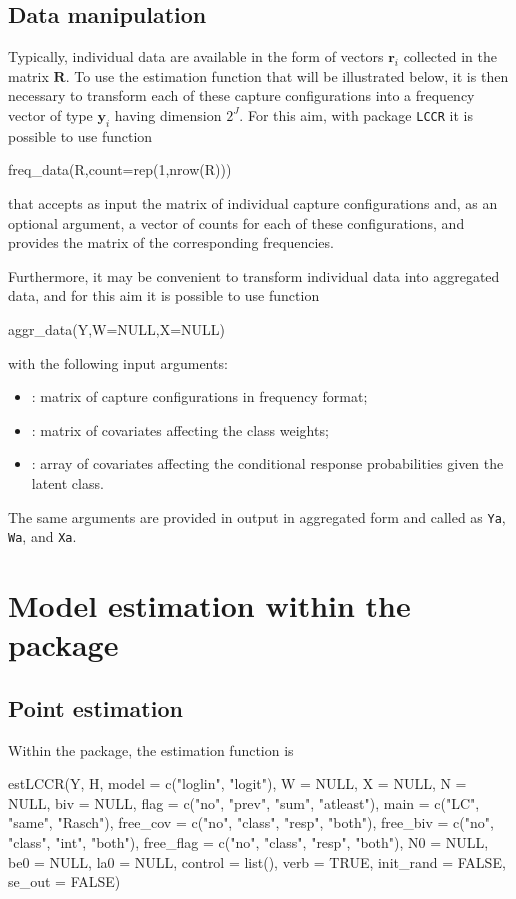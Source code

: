 \subsection{Data manipulation}
%
Typically, individual data are available in the form of vectors $\bm{r}_i$ collected in the matrix $\bm{R}$.
To use the estimation function that will be illustrated below, it is then necessary to transform each of these capture configurations into a frequency vector of type $\bm{y}_i$ having dimension $2^J$.
For this aim, with package {\tt LCCR} it is possible to use function
%
\begin{example*}
freq\_data(R,count=rep(1,nrow(R)))
\end{example*}
%
that accepts as input the matrix of individual capture configurations and, as an optional argument, a vector of counts for each of these configurations, and provides the matrix of the corresponding frequencies.

Furthermore, it may be convenient to transform individual data into aggregated data, and for this aim it is possible to use function
%
\begin{example*}
aggr\_data(Y,W=NULL,X=NULL)
\end{example*}
%
with the following input arguments:
%
\begin{itemize}
%
\item {}: matrix of capture configurations in frequency format;
%
\item {}: matrix of covariates affecting the class weights;
%
\item {}: array of covariates affecting the conditional response probabilities given the latent class.
%
\end{itemize}

The same arguments are provided in output in aggregated form and called as {\tt Ya}, {\tt Wa}, and {\tt Xa}.
%
\section{Model estimation within the package}
%
\subsection{Point estimation}
%
Within the package, the estimation function is
%
\begin{example*}
estLCCR(Y, H, model = c("loglin", "logit"), W = NULL, X = NULL, N = NULL, biv = NULL,
        flag = c("no", "prev", "sum", "atleast"),
        main = c("LC", "same", "Rasch"),
        free_cov = c("no", "class", "resp", "both"),
        free_biv = c("no", "class", "int", "both"),
        free_flag = c("no", "class", "resp", "both"),
        N0 = NULL, be0 = NULL, la0 = NULL, control = list(),
        verb = TRUE, init_rand = FALSE, se_out = FALSE)
\end{example*}

